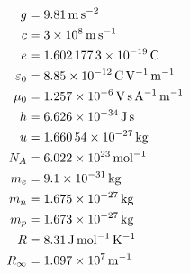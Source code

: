 
\begin{align}
\label{eq:konstanten:fallbeschleunigung}
g &= \SI{9.81}{\meter\per\second\squared}\\
\label{eq:konstanten:lichtgeschwindigkeit}
c &= \SI{3d8}{\meter\per\second}\\
\label{eq:konstanten:elementarladung}
e &= \SI{1.6021773d-19}{\coulomb}\\
\label{eq:konstanten:elektrische:feldkonstante}
\varepsilon_0 &= \SI{8.85d-12}{\coulomb\per\volt\per\meter}\\
\label{eq:konstanten:magnetische:feldkonstante}
\mu_0 &= \SI{1.257d-6}{\volt\second\per\ampere\per\meter}\\
\label{eq:konstanten:planck:konstante}
h &= \SI{6.626d-34}{\joule\second}\\
\label{eq:konstanten:atomare:masseneinheit}
u &= \SI{1.66054d-27}{\kilogram}\\
\label{eq:konstanten:avogadro:konstante}
N_A &= \SI{6.022d23}{\per\mol}\\
\label{eq:konstanten:masse:elektron}
m_e &= \SI{9.1d-31}{\kilogram}\\
\label{eq:konstanten:masse:neutron}
m_n &= \SI{1.675d-27}{\kilogram}\\
\label{eq:konstanten:masse:proton}
m_p &= \SI{1.673d-27}{\kilogram}\\
\label{eq:konstanten:allgemeine:gaskonstante}
R &= \SI{8.31}{\joule\per\mol\per\kelvin}\\
\label{eq:konstanten:rydberg:konstante}
R_\infty &= \SI{1.097e7}{\per\meter}
\end{align}